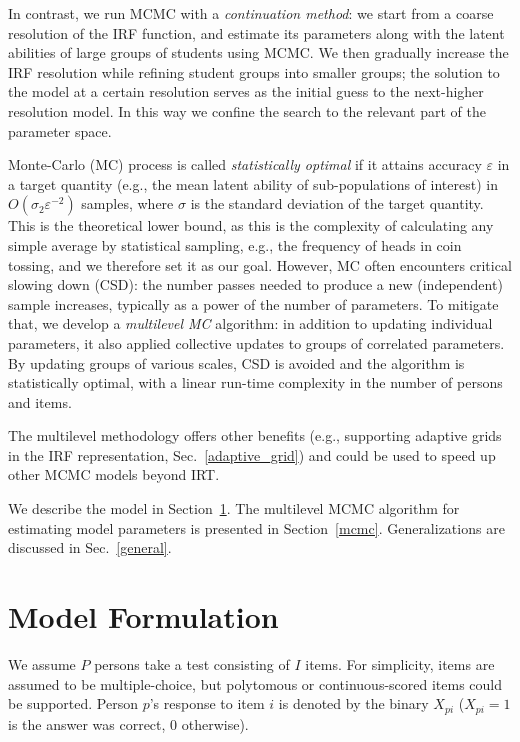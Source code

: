 \documentclass{article}
\begin{document}
In contrast, we run MCMC with a {\it continuation method}: we start from a coarse resolution of the IRF function, and estimate its parameters along with the latent abilities of large groups of students using MCMC. We then gradually increase the IRF resolution while refining student groups into smaller groups; the solution to the model at a certain resolution serves as the initial guess to the next-higher resolution model. In this way we confine the search to the relevant part of the parameter space.

Monte-Carlo (MC) process is called {\it statistically optimal} if it attains accuracy $\varepsilon$ in a target quantity (e.g., the mean latent ability of sub-populations of interest) in $O(\sigma_2 \varepsilon^{-2})$ samples, where $\sigma$ is the standard deviation of the target quantity. This is the theoretical lower bound, as this is the complexity of calculating any simple average by statistical sampling, e.g., the frequency of heads in coin tossing, and we therefore set it as our goal. However, MC often encounters critical slowing down (CSD): the number passes needed to produce a new (independent) sample increases, typically as a power of the number of parameters. To mitigate that, we develop a {\it multilevel MC} algorithm: in addition to updating individual parameters, it also applied collective updates to groups of correlated parameters. By updating groups of various scales, CSD is avoided and the algorithm is statistically optimal, with a linear run-time complexity in the number of persons and items. 

The multilevel methodology offers other benefits (e.g., supporting adaptive grids in the IRF representation, Sec.~\ref{adaptive_grid}) and could be used to speed up other MCMC models beyond IRT.

We describe the model in Section~\ref{model}. The multilevel MCMC algorithm for estimating model parameters is presented in Section~\ref{mcmc}. Generalizations are discussed in Sec.~\ref{general}.

\section{Model Formulation}
\label{model}
We assume $P$ persons take a test consisting of $I$ items. For simplicity, items are assumed to be multiple-choice, but polytomous or continuous-scored items could be supported. Person $p$'s response to item $i$ is denoted by the binary $X_{pi}$ ($X_{pi}=1$ is the answer was correct, $0$ otherwise).
\end{document}
